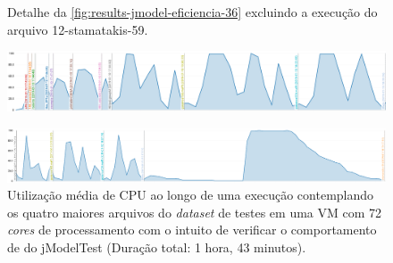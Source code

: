 \documentclass[english,brazilian]{UNISINOSmonografia} %
\begin{document}
\begin{figure}[btp]
	\begin{minipage}{\textwidth}
		\caption{Detalhe da \autoref{fig:results-jmodel-eficiencia-36} excluindo a execução do arquivo 12-stamatakis-59.}
		\label{fig:results-jmodel-eficiencia-36-ex12}
		\vspace{1ex}
		\includegraphics[width=\textwidth]{results-jmodel-eficiencia-36-ex12}
	\end{minipage}
	\begin{minipage}{\textwidth}
		\caption{Utilização média de CPU ao longo de uma execução contemplando os quatro maiores arquivos do \textit{dataset} de testes em uma VM com 72 \textit{cores} de processamento com o intuito de verificar o comportamento de do jModelTest  (Duração total: 1 hora, 43 minutos).}
		\label{fig:results-jmodel-eficiencia-72-maiores}
		\vspace{1ex}
		\includegraphics[width=\textwidth]{results-jmodel-eficiencia-72-maiores}
	\end{minipage}
\end{figure}
\end{document}
